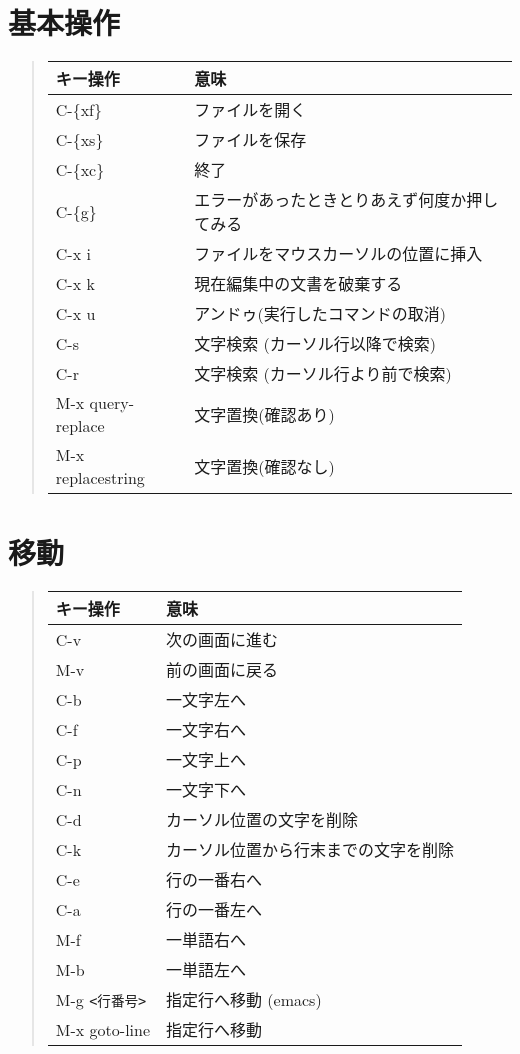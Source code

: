 \documentclass{jreport}
\begin{document}
\section{基本操作}

\begin{quote}
\begin{tabular}[t]{ll}\hline
キー操作 & 意味 \\ \hline
C-\{xf\} & ファイルを開く \\
C-\{xs\} & ファイルを保存 \\
C-\{xc\} & 終了 \\
C-\{g\} & エラーがあったときとりあえず何度か押してみる \\
C-x i & ファイルをマウスカーソルの位置に挿入 \\
C-x k & 現在編集中の文書を破棄する \\
C-x u & アンドゥ(実行したコマンドの取消)\\
C-s & 文字検索 (カーソル行以降で検索)\\
C-r & 文字検索 (カーソル行より前で検索)\\
M-x query-replace & 文字置換(確認あり) \\
M-x replacestring & 文字置換(確認なし)\\
\hline
\end{tabular}
\end{quote}

\section{移動}

\begin{quote}
\begin{tabular}[t]{ll}\hline
キー操作 & 意味 \\ \hline
C-v & 次の画面に進む\\
M-v & 前の画面に戻る \\
C-b & 一文字左へ \\
C-f & 一文字右へ \\
C-p & 一文字上へ \\
C-n & 一文字下へ \\
C-d & カーソル位置の文字を削除 \\
C-k & カーソル位置から行末までの文字を削除 \\
C-e & 行の一番右へ\\
C-a & 行の一番左へ\\
M-f & 一単語右へ\\
M-b & 一単語左へ\\
M-g \verb|<行番号>| & 指定行へ移動 (emacs)\\
M-x goto-line& 指定行へ移動 \\
\hline
\end{tabular}
\end{quote}
\end{document}
